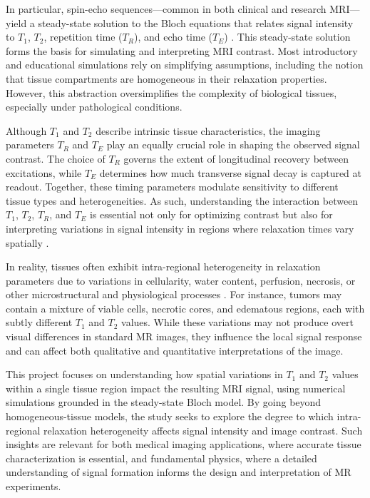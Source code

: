 \documentclass[10pt,a4paper,twoside]{article}
\begin{document}
In particular, spin-echo sequences—common in both clinical and research MRI—yield a steady-state solution to the Bloch equations that relates signal intensity to $T_1$, $T_2$, repetition time ($T_R$), and echo time ($T_E$) \cite{bernstein2004}. This steady-state solution forms the basis for simulating and interpreting MRI contrast. Most introductory and educational simulations rely on simplifying assumptions, including the notion that tissue compartments are homogeneous in their relaxation properties. However, this abstraction oversimplifies the complexity of biological tissues, especially under pathological conditions.

Although $T_1$ and $T_2$ describe intrinsic tissue characteristics, the imaging parameters $T_R$ and $T_E$ play an equally crucial role in shaping the observed signal contrast. The choice of $T_R$ governs the extent of longitudinal recovery between excitations, while $T_E$ determines how much transverse signal decay is captured at readout. Together, these timing parameters modulate sensitivity to different tissue types and heterogeneities. As such, understanding the interaction between $T_1$, $T_2$, $T_R$, and $T_E$ is essential not only for optimizing contrast but also for interpreting variations in signal intensity in regions where relaxation times vary spatially \cite{bernstein2004}.

In reality, tissues often exhibit intra-regional heterogeneity in relaxation parameters due to variations in cellularity, water content, perfusion, necrosis, or other microstructural and physiological processes \cite{tofts2003}. For instance, tumors may contain a mixture of viable cells, necrotic cores, and edematous regions, each with subtly different $T_1$ and $T_2$ values. While these variations may not produce overt visual differences in standard MR images, they influence the local signal response and can affect both qualitative and quantitative interpretations of the image.

This project focuses on understanding how spatial variations in $T_1$ and $T_2$ values within a single tissue region impact the resulting MRI signal, using numerical simulations grounded in the steady-state Bloch model. By going beyond homogeneous-tissue models, the study seeks to explore the degree to which intra-regional relaxation heterogeneity affects signal intensity and image contrast. Such insights are relevant for both medical imaging applications, where accurate tissue characterization is essential, and fundamental physics, where a detailed understanding of signal formation informs the design and interpretation of MR experiments.
\end{document}
